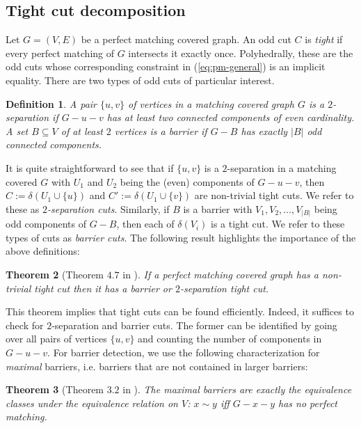\documentclass[11pt]{article}
\newcommand{\1}{\mathbf{1}}
\newcommand{\0}{\mathbf{0}}
\newtheorem{theorem}{Theorem}[section]
\newtheorem{DE}[theorem]{Definition}
\begin{document}
\subsection{Tight cut decomposition}
Let $G=(V,E)$ be a perfect matching covered graph. An odd cut $C$ is \emph{tight} if every perfect matching of $G$ intersects it exactly once. Polyhedrally, these are the odd cuts whose corresponding constraint in (\ref{eq:pm-general}) is an implicit equality. There are two types of odd cuts of particular interest.
\begin{DE}
    A pair $\{u,v\}$ of vertices in a matching covered graph $G$ is a \emph{$2$-separation} if $G-u-v$ has at least two connected components of even cardinality. A set $B\subseteq V$ of at least $2$ vertices is a \emph{barrier} if $G-B$ has exactly $|B|$ odd connected components.
\end{DE}
It is quite straightforward to see that if $\{u,v\}$ is a $2$-separation in a matching covered $G$ with $U_1$ and $U_2$ being the (even) components of $G-u-v$, then $C:=\delta(U_1\cup \{u\})$ and $C':=\delta(U_1\cup \{v\})$ are non-trivial tight cuts. We refer to these as \emph{$2$-separation cuts}.
Similarly, if $B$ is a barrier with $V_1, V_2, \ldots, V_{|B|}$ being odd components of $G-B$, then each of $\delta(V_i)$ is a tight cut. We refer to these types of cuts as \emph{barrier cuts}.
The following result highlights the importance of the above definitions:
\begin{theorem}[Theorem $4.7$ in \cite{edmonds1982brick}]\label{thm:tight-cut-find}
    If a perfect matching covered graph has a non-trivial tight cut then it has a barrier or $2$-separation tight cut.
\end{theorem}
This theorem implies that tight cuts can be found efficiently. Indeed, it suffices to check for $2$-separation and barrier cuts. The former can be identified by going over all pairs of vertices $\{u,v\}$ and counting the number of components in $G-u-v$. For barrier detection, we use the following characterization for \emph{maximal} barriers, i.e. barriers that are not contained in larger barriers: \begin{theorem}[Theorem $3.2$ in \cite{LovaszOntheStr}]\label{thm:barrier-find}
    The maximal barriers are exactly the equivalence classes under the equivalence relation on $V$: $x\sim y$ iff $G-x-y$ has no perfect matching.
\end{theorem}
\end{document}
